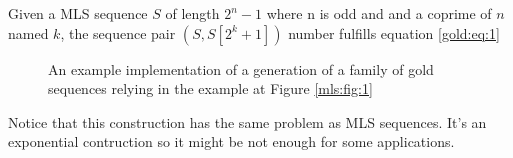 \begin{property}
  Given a MLS sequence $S$ of length $2^n - 1$ where n is odd and and a
  coprime of $n$ named $k$, the sequence pair $(S, S[2^{k} + 1])$ number
  fulfills equation \ref{gold:eq:1}
\end{property}

\begin{figure}[ht!]
  \caption{An example implementation of a generation of a family of gold
  sequences relying in the example at Figure \ref{mls:fig:1}}
  \label{}
\end{figure}

Notice that this construction has the same problem as MLS sequences. It's
an exponential contruction so it might be not enough for some applications.
